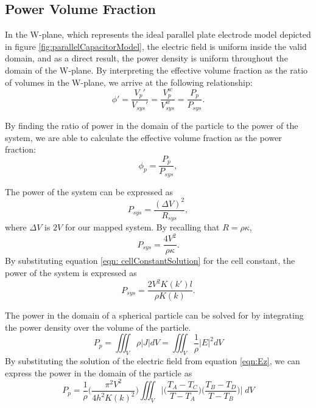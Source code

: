 \subsection*{Power Volume Fraction}
\par In the W-plane, which represents the ideal parallel plate electrode model depicted in figure \ref{fig:parallelCapacitorModel}, the electric field is uniform inside the valid domain, and as a direct result, the power density is uniform throughout the domain of the W-plane. By interpreting the effective volume fraction as the ratio of volumes in the W-plane, we arrive at the following relationship:
\begin{equation}
    \phi ' = \frac{V_p'}{V_{sys}'} = \frac{V^w_p}{V^w_{sys}} = \frac{P_p}{P_{sys}}.
    \label{eqn: effectiveVolumeFractions}
\end{equation}

\par By finding the ratio of power in the domain of the particle to the power of the system, we are able to calculate the effective volume fraction as the power fraction:
\begin{equation}
    \phi_p = \frac{P_p}{P_{sys}},
    \label{eqn: powerVolumeFraction_initial}
\end{equation}

\noindent The power of the system can be expressed as
\begin{equation}
    P_{sys} = \frac{(\Delta V)^2}{R_{sys}},
\end{equation}
\noindent where $\Delta V$ is $2V$ for our mapped system. By recalling that $R=\rho\kappa$,
\begin{equation}
    P_{sys} = \frac{4V^2}{\rho\kappa}.
\end{equation}
\noindent By substituting equation \ref{eqn: cellConstantSolution} for the cell constant, the power of the system is expressed as 
\begin{equation}
    P_{sys} = \frac{2V^2K(k')l}{\rho K(k)}.
    \label{eqn: powerSystem}
\end{equation}

\par The power in the domain of a spherical particle can be solved for by integrating the power density over the volume of the particle.
\begin{equation}
    P_p = \iiint_V \rho \big| J \big| dV = \iiint_V \frac{1}{\rho} \big| E \big|^2 dV
\end{equation}
\noindent By substituting the solution of the electric field from equation \ref{eqn:Ez}, we can express the power in the domain of the particle as
\begin{equation}
    P_p = \frac{1}{\rho}\bigg(\frac{\pi^2 V^2}{4h^2K(k)^2}\bigg)\iiint_V \bigg|\bigg(\frac{T_A-T_C}{T-T_A}\bigg)\bigg(\frac{T_B-T_D}{T-T_B}\bigg)\bigg| \;dV
    \label{eqn: powerParticle}
\end{equation}

